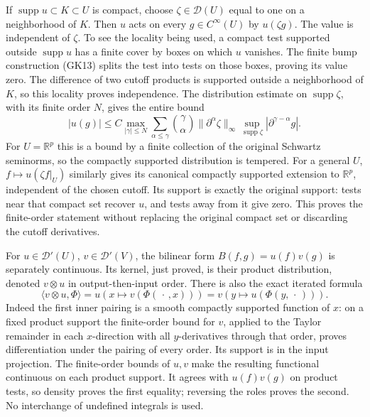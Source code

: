 \documentclass[
  11pt,
]{article}
\begin{document}
If \(\operatorname{supp}u\subset K\subset U\) is compact, choose
\(\zeta\in\mathcal D(U)\) equal to one on a neighborhood of \(K\). Then
\(u\) acts on every \(g\in C^\infty(U)\) by \(u(\zeta g)\). The value is
independent of \(\zeta\). To see the locality being used, a compact test
supported outside \(\operatorname{supp}u\) has a finite cover by boxes
on which \(u\) vanishes. The finite bump construction (GK13) splits the
test into tests on those boxes, proving its value zero. The difference
of two cutoff products is supported outside a neighborhood of \(K\), so
this locality proves independence. The distribution estimate on
\(\operatorname{supp}\zeta\), with its finite order \(N\), gives the
entire bound \[
 |u(g)|\leq C
 \max_{|\gamma|\leq N}
 \sum_{\alpha\leq\gamma}\binom{\gamma}{\alpha}
       \|\partial^\alpha\zeta\|_\infty
       \sup_{\operatorname{supp}\zeta}
                    |\partial^{\gamma-\alpha}g|.
 \tag{GK24}
\] For \(U=\mathbb R^p\) this is a bound by a finite collection of the
original Schwartz seminorms, so the compactly supported distribution is
tempered. For a general \(U\), \(f\mapsto u(\zeta f|_U)\) similarly
gives its canonical compactly supported extension to \(\mathbb R^p\),
independent of the chosen cutoff. Its support is exactly the original
support: tests near that compact set recover \(u\), and tests away from
it give zero. This proves the finite-order statement without replacing
the original compact set or discarding the cutoff derivatives.

For \(u\in\mathcal D'(U)\), \(v\in\mathcal D'(V)\), the bilinear form
\(B(f,g)=u(f)v(g)\) is separately continuous. Its kernel, just proved,
is their product distribution, denoted \(v\otimes u\) in
output-then-input order. There is also the exact iterated formula \[
 \langle v\otimes u,\Phi\rangle
    =u\!\left(x\mapsto v(\Phi(\,\cdot\,,x))\right)
    =v\!\left(y\mapsto u(\Phi(y,\,\cdot\,))\right).
 \tag{GK25}
\] Indeed the first inner pairing is a smooth compactly supported
function of \(x\): on a fixed product support the finite-order bound for
\(v\), applied to the Taylor remainder in each \(x\)-direction with all
\(y\)-derivatives through that order, proves differentiation under the
pairing of every order. Its support is in the input projection. The
finite-order bounds of \(u,v\) make the resulting functional continuous
on each product support. It agrees with \(u(f)v(g)\) on product tests,
so density proves the first equality; reversing the roles proves the
second. No interchange of undefined integrals is used.
\end{document}
